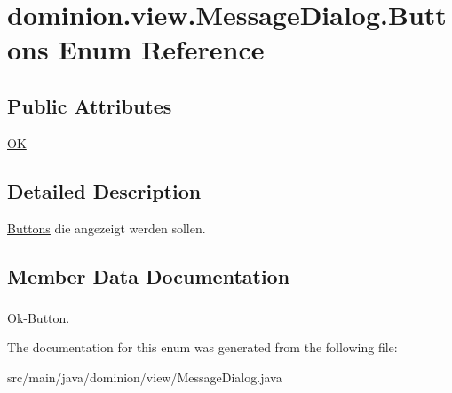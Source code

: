 \hypertarget{enumdominion_1_1view_1_1MessageDialog_1_1Buttons}{\section{dominion.\-view.\-Message\-Dialog.\-Buttons \-Enum \-Reference}
\label{enumdominion_1_1view_1_1MessageDialog_1_1Buttons}
}
\subsection*{\-Public \-Attributes}
\begin{DoxyCompactItemize}
\item 
\hyperlink{enumdominion_1_1view_1_1MessageDialog_1_1Buttons_a8898f7bb9f76ee42f91d7775d064bbc3}{\-O\-K}
\end{DoxyCompactItemize}


\subsection{\-Detailed \-Description}
\hyperlink{enumdominion_1_1view_1_1MessageDialog_1_1Buttons}{\-Buttons} die angezeigt werden sollen. 

\subsection{\-Member \-Data \-Documentation}
\hypertarget{enumdominion_1_1view_1_1MessageDialog_1_1Buttons_a8898f7bb9f76ee42f91d7775d064bbc3}{
\subsubsection[{\-O\-K}]{}}\label{enumdominion_1_1view_1_1MessageDialog_1_1Buttons_a8898f7bb9f76ee42f91d7775d064bbc3}
\-Ok-\/\-Button. 

\-The documentation for this enum was generated from the following file\-:\begin{DoxyCompactItemize}
\item 
src/main/java/dominion/view/\-Message\-Dialog.\-java\end{DoxyCompactItemize}
